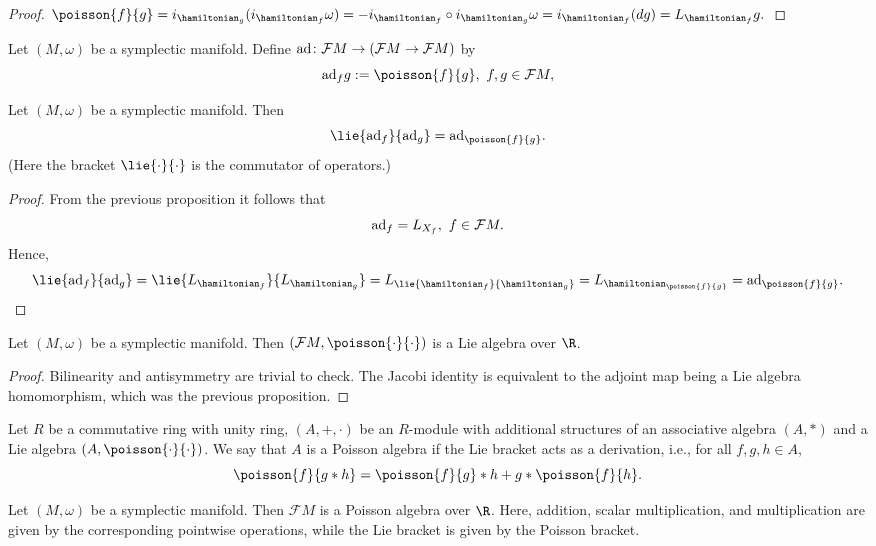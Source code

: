 \begin{proof}
  $
    \poisson{f}{g}
    = i_{\hamiltonian_g}(i_{\hamiltonian_f} \omega)
    = - i_{\hamiltonian_f} \circ i_{\hamiltonian_g} \omega
    = i_{\hamiltonian_f}(d g)
    = L_{\hamiltonian_f} g.
  $
\end{proof}
\begin{definition}
  Let $(M, \omega)$ be a symplectic manifold.
  Define
  ${\rm ad} \colon \mathcal{F} M \to (\mathcal{F} M \to \mathcal{F} M)$ by
  \begin{equation}
    {\rm ad}_f g := \poisson{f}{g},\ f, g \in \mathcal{F} M,
  \end{equation}
\end{definition}
\begin{proposition}
  Let $(M, \omega)$ be a symplectic manifold.
  Then
  \begin{equation}
    \lie{{\rm ad}_f}{{\rm ad}_g} = {\rm ad}_{\poisson{f}{g}}.
  \end{equation}
  (Here the bracket $\lie{\cdot}{\cdot}$ is the commutator of operators.)
\end{proposition}
\begin{proof}
  From the previous proposition it follows that
  \begin{equation}
    {\rm ad}_f = L_{X_f},\ f \in \mathcal{F} M.
  \end{equation}
  Hence,
  \begin{equation}
    \lie{{\rm ad}_f}{{\rm ad}_g}
    = \lie{L_{\hamiltonian_f}}{L_{\hamiltonian_g}}
    = L_{\lie{\hamiltonian_f}{\hamiltonian_g}}
    = L_{\hamiltonian_{\poisson{f}{g}}}
    = {\rm ad}_{\poisson{f}{g}}.
  \end{equation}
\end{proof}
\begin{corollary}
  Let $(M, \omega)$ be a symplectic manifold.
  Then $(\mathcal{F} M, \poisson{\cdot}{\cdot})$ is a Lie algebra over $\R$.
\end{corollary}
\begin{proof}
  Bilinearity and antisymmetry are trivial to check.
  The Jacobi identity is equivalent to the adjoint map being a Lie algebra
  homomorphism, which was the previous proposition.
\end{proof}
\begin{definition}
  Let
    $R$ be a commutative ring with unity ring,
    $(A, +, \cdot)$ be an $R$-module
    with additional structures of
    an associative algebra $(A, *)$ and
    a Lie algebra $(A, \poisson{\cdot}{\cdot})$.
  We say that $A$ is a Poisson algebra if the Lie bracket acts as a derivation,
  i.e., for all $f, g, h \in A$,
  \begin{equation}
    \poisson{f}{g * h} = \poisson{f}{g} * h + g * \poisson{f}{h}.
  \end{equation}
\end{definition}
\begin{corollary}
  Let $(M, \omega)$ be a symplectic manifold.
  Then $\mathcal{F} M$ is a Poisson algebra over $\R$.
  Here, addition, scalar multiplication, and multiplication are given by the
  corresponding pointwise operations, while the Lie bracket is given by the
  Poisson bracket.
\end{corollary}
